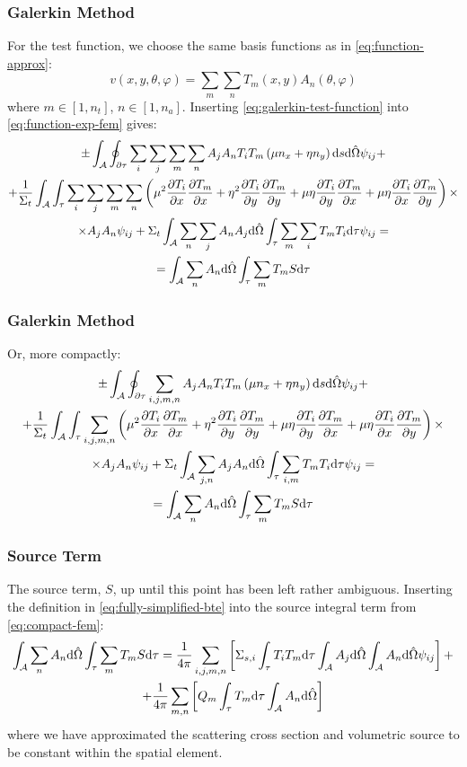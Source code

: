 \begin{frame}
  \frametitle{Galerkin Method}
  For the test function, we choose the same basis functions as in \cref{eq:function-approx}:
  \begin{equation}\label{eq:galerkin-test-function}
    v(x,y,\theta,\varphi)=\sum_m\sum_n T_m(x,y)A_n(\theta,\varphi)
  \end{equation}
  where $m\in[1,n_t]$, $n\in[1,n_a]$.
  Inserting \cref{eq:galerkin-test-function} into \cref{eq:function-exp-fem} gives:
  \begin{multline}
    \pm\int_\mathcal{A}\oint_{\partial \tau}\sum_i\sum_j\sum_m\sum_n A_jA_n T_i T_m\left(\mu n_x+\eta n_y\right)\dd s\dd\hat{\Omega}\psi_{ij}+\\+
    \frac{1}{\Sigma_t}\int_{\mathcal{A}}\int_{\tau}\sum_i\sum_j\sum_m\sum_n\left(\mu^2\pdv{T_i}{x}\pdv{T_m}{x}+\eta^2\pdv{T_i}{y}\pdv{T_m}{y}+\mu\eta\pdv{T_i}{y}\pdv{T_m}{x}+\mu\eta\pdv{T_i}{x}\pdv{T_m}{y}\right)\times\\\times
    A_jA_n\psi_{ij}+\Sigma_t\int_{\mathcal{A}}\sum_n\sum_jA_nA_j\dd\hat{\Omega}\int_\tau\sum_m\sum_iT_mT_i\dd\tau\psi_{ij}=\\=
    \int_\mathcal{A}\sum_nA_n\dd \hat{\Omega}\int_\tau\sum_mT_mS\dd\tau
  \end{multline}
\end{frame}

\begin{frame}
  \frametitle{Galerkin Method}
  Or, more compactly:
  \begin{multline}\label{eq:compact-fem}
    \pm\int_\mathcal{A}\oint_{\partial \tau}\sum_{i,j,m,n}A_jA_n T_i T_m\left(\mu n_x+\eta n_y\right)\dd s\dd\hat{\Omega}\psi_{ij}+\\+
    \frac{1}{\Sigma_t}\int_{\mathcal{A}}\int_{\tau}\sum_{i,j,m,n}\left(\mu^2\pdv{T_i}{x}\pdv{T_m}{x}+\eta^2\pdv{T_i}{y}\pdv{T_m}{y}+\mu\eta\pdv{T_i}{y}\pdv{T_m}{x}+\mu\eta\pdv{T_i}{x}\pdv{T_m}{y}\right)\times \\\times A_jA_n\psi_{ij}+
    \Sigma_t\int_\mathcal{A}\sum_{j,n}A_jA_n\dd\hat{\Omega}\int_\tau\sum_{i,m}T_mT_i\dd\tau\psi_{ij}=\\=
    \int_\mathcal{A}\sum_nA_n\dd \hat{\Omega}\int_\tau\sum_mT_mS\dd\tau
  \end{multline}
\end{frame}

\begin{frame}
  \frametitle{Source Term}
  The source term, $S$, up until this point has been left rather ambiguous.
  Inserting the definition in \cref{eq:fully-simplified-bte} into the source integral term from \cref{eq:compact-fem}:
  \begin{multline}
    \int_\mathcal{A}\sum_nA_n\dd \hat{\Omega}\int_\tau\sum_mT_mS\dd\tau =
    \frac{1}{4\pi}\sum_{i,j,m,n}\left[\Sigma_{s,i}\int_\tau T_iT_m\dd\tau\int_\mathcal{A} A_j\dd\hat{\Omega} \int_\mathcal{A} A_n\dd\hat{\Omega} \psi_{ij}\right]+\\+
    \frac{1}{4\pi}\sum_{m,n} \left[Q_m\int_\tau  T_m\dd\tau\int_\mathcal{A}A_n\dd\hat{\Omega}\right]
  \end{multline}
  where we have approximated the scattering cross section and volumetric source to be constant within the spatial element.
\end{frame}

